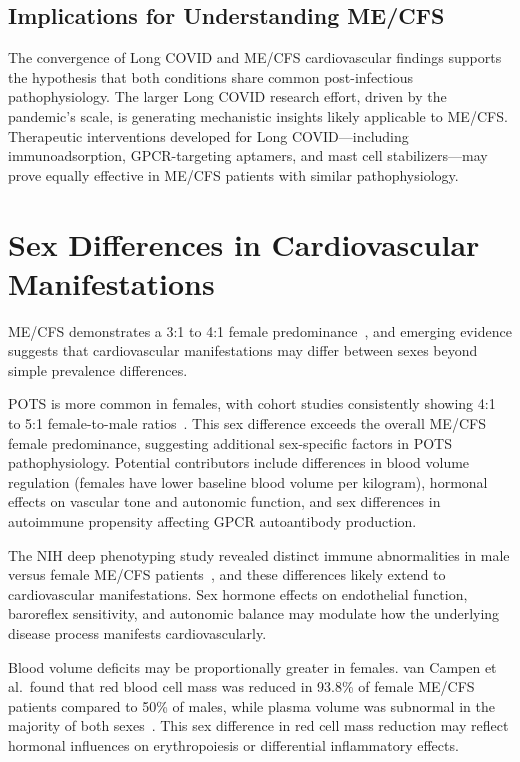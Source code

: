 \subsection{Implications for Understanding ME/CFS}

The convergence of Long COVID and ME/CFS cardiovascular findings supports the hypothesis that both conditions share common post-infectious pathophysiology. The larger Long COVID research effort, driven by the pandemic's scale, is generating mechanistic insights likely applicable to ME/CFS. Therapeutic interventions developed for Long COVID---including immunoadsorption, GPCR-targeting aptamers, and mast cell stabilizers---may prove equally effective in ME/CFS patients with similar pathophysiology.

\section{Sex Differences in Cardiovascular Manifestations}
\label{sec:cv-sex-differences}

ME/CFS demonstrates a 3:1 to 4:1 female predominance~\cite{jason2018prevalence}, and emerging evidence suggests that cardiovascular manifestations may differ between sexes beyond simple prevalence differences.

POTS is more common in females, with cohort studies consistently showing 4:1 to 5:1 female-to-male ratios~\cite{Newton2008POTSprevalence}. This sex difference exceeds the overall ME/CFS female predominance, suggesting additional sex-specific factors in POTS pathophysiology. Potential contributors include differences in blood volume regulation (females have lower baseline blood volume per kilogram), hormonal effects on vascular tone and autonomic function, and sex differences in autoimmune propensity affecting GPCR autoantibody production.

The NIH deep phenotyping study revealed distinct immune abnormalities in male versus female ME/CFS patients~\cite{walitt2024deep}, and these differences likely extend to cardiovascular manifestations. Sex hormone effects on endothelial function, baroreflex sensitivity, and autonomic balance may modulate how the underlying disease process manifests cardiovascularly.

Blood volume deficits may be proportionally greater in females. van Campen et al.\ found that red blood cell mass was reduced in 93.8\% of female ME/CFS patients compared to 50\% of males, while plasma volume was subnormal in the majority of both sexes~\cite{vanCampen2018}. This sex difference in red cell mass reduction may reflect hormonal influences on erythropoiesis or differential inflammatory effects.

